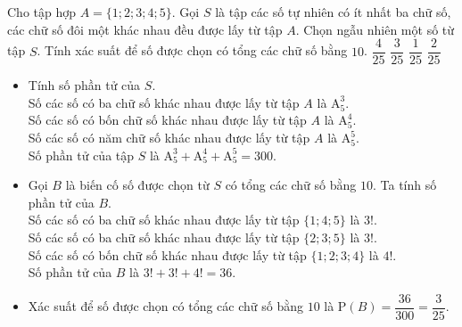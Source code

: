 \begin{ex}%
 Cho tập hợp $A=\{1;2;3;4;5\}$. Gọi $S$ là tập các số tự nhiên có ít nhất ba chữ số, các chữ số đôi một khác nhau đều được lấy từ tập $A$. Chọn ngẫu nhiên một số từ tập $S$. Tính xác suất để số được chọn có tổng các chữ số bằng $10$.
 \choice
  {$\dfrac{4}{25}$}
  {\True $\dfrac{3}{25}$}
  {$\dfrac{1}{25}$}
  {$\dfrac{2}{25}$}
 \loigiai
  {
  \begin{itemize}
   \item Tính số phần tử của $S$.\\
   Số các số có ba chữ số khác nhau được lấy từ tập $A$ là $\mathrm{A}_5^3$.\\
   Số các số có bốn chữ số khác nhau được lấy từ tập $A$ là $\mathrm{A}_5^4$.\\
   Số các số có năm chữ số khác nhau được lấy từ tập $A$ là $\mathrm{A}_5^5$.\\
   Số phần tử của tập $S$ là $\mathrm{A}_5^3 + \mathrm{A}_5^4 + \mathrm{A}_5^5 = 300$.
   \item Gọi $B$ là biến cố số được chọn từ $S$ có tổng các chữ số bằng $10$. Ta tính số phần tử của $B$.\\
   Số các số có ba chữ số khác nhau được lấy từ tập $\{1;4;5\}$ là $3!$.\\
   Số các số có ba chữ số khác nhau được lấy từ tập $\{2;3;5\}$ là $3!$.\\
   Số các số có bốn chữ số khác nhau được lấy từ tập $\{1;2;3;4\}$ là $4!$.\\
   Số phần tử của $B$ là $3! + 3! + 4! = 36$.
   \item Xác suất để số được chọn có tổng các chữ số bằng $10$ là $\mathrm{P}(B) = \dfrac{36}{300} = \dfrac{3}{25}$.
  \end{itemize}
  
  }
\end{ex}


